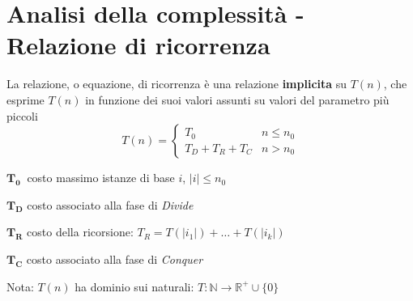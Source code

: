 \section{Analisi della complessità - Relazione di ricorrenza}
La relazione, o equazione, di ricorrenza è una relazione \textbf{implicita} su $T(n)$, che esprime $T(n)$ in funzione dei suoi valori assunti su valori del parametro più piccoli
\[
    T(n) = 
    \begin{cases} 
        T_0      &  n \leq n_0 \\
        T_D + T_R + T_C & n > n_0
    \end{cases}
\]
\begin{description}
    \item{$\bm{T_0}\:$} costo massimo istanze di base $i$, $|i| \leq n_0$
    \item{$\bm{T_D}$} costo associato alla fase di \textit{Divide}
    \item{$\bm{T_R}$} costo della ricorsione: $T_R = T(|i_1|) + \dots + T(|i_k|)$
    \item{$\bm{T_C}$} costo associato alla fase di \textit{Conquer}
\end{description}
Nota: $T(n)$ ha dominio sui naturali: $T : \mathbb{N} \rightarrow \mathbb{R}^{+} \cup \{0\}$

